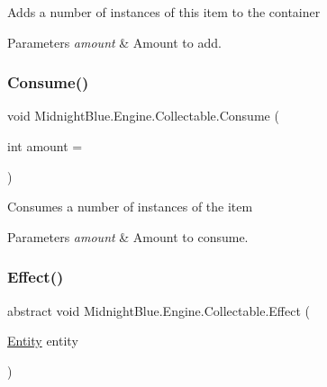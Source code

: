 Adds a number of instances of this item to the container 


\begin{DoxyParams}{Parameters}
{\em amount} & Amount to add.\\
\hline
\end{DoxyParams}
\hypertarget{class_midnight_blue_1_1_engine_1_1_collectable_a2563b260d18521524bce996bc153dffb}{}\label{class_midnight_blue_1_1_engine_1_1_collectable_a2563b260d18521524bce996bc153dffb} 
\subsubsection{\texorpdfstring{Consume()}{Consume()}}
{\footnotesize\ttfamily void Midnight\+Blue.\+Engine.\+Collectable.\+Consume (\begin{DoxyParamCaption}\item[{int}]{amount = {} }\end{DoxyParamCaption})\hspace{0.3cm}{\ttfamily [inline]}}



Consumes a number of instances of the item 


\begin{DoxyParams}{Parameters}
{\em amount} & Amount to consume.\\
\hline
\end{DoxyParams}
\hypertarget{class_midnight_blue_1_1_engine_1_1_collectable_a72a7783ba8fc1bb116193db38a465a6f}{}\label{class_midnight_blue_1_1_engine_1_1_collectable_a72a7783ba8fc1bb116193db38a465a6f} 
\subsubsection{\texorpdfstring{Effect()}{Effect()}}
{\footnotesize\ttfamily abstract void Midnight\+Blue.\+Engine.\+Collectable.\+Effect (\begin{DoxyParamCaption}\item[{\hyperlink{class_midnight_blue_1_1_engine_1_1_entity_component_1_1_entity}{Entity}}]{entity }\end{DoxyParamCaption})\hspace{0.3cm}{\ttfamily [pure virtual]}}



